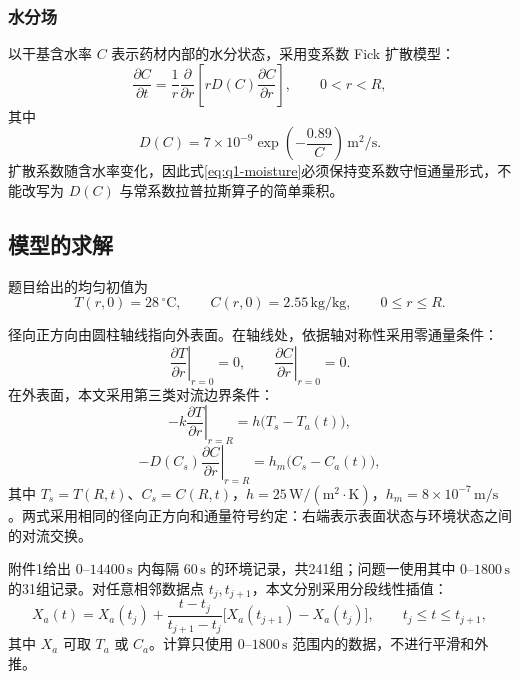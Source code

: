 \subsubsection{水分场}

以干基含水率 $C$ 表示药材内部的水分状态，采用变系数 Fick 扩散模型：
\begin{equation}
\frac{\partial C}{\partial t}
=\frac{1}{r}\frac{\partial}{\partial r}
\left[rD(C)\frac{\partial C}{\partial r}\right],
\qquad 0<r<R,
\label{eq:q1-moisture}
\end{equation}
其中
\begin{equation}
D(C)=7\times10^{-9}\exp\left(-\frac{0.89}{C}\right)\,\mathrm{m^2/s}.
\label{eq:q1-diffusivity}
\end{equation}
扩散系数随含水率变化，因此式\eqref{eq:q1-moisture}必须保持变系数守恒通量形式，不能改写为 $D(C)$ 与常系数拉普拉斯算子的简单乘积。

\subsection{模型的求解}

题目给出的均匀初值为
\begin{equation}
T(r,0)=28\,{}^\circ\mathrm{C},\qquad
C(r,0)=2.55\,\mathrm{kg/kg},
\qquad 0\le r\le R.
\label{eq:q1-initial}
\end{equation}

径向正方向由圆柱轴线指向外表面。在轴线处，依据轴对称性采用零通量条件：
\begin{equation}
\left.\frac{\partial T}{\partial r}\right|_{r=0}=0,
\qquad
\left.\frac{\partial C}{\partial r}\right|_{r=0}=0.
\label{eq:q1-center-bc}
\end{equation}
在外表面，本文采用第三类对流边界条件：
\begin{equation}
-k\left.\frac{\partial T}{\partial r}\right|_{r=R}
=h\bigl(T_s-T_a(t)\bigr),
\label{eq:q1-thermal-bc}
\end{equation}
\begin{equation}
-D(C_s)\left.\frac{\partial C}{\partial r}\right|_{r=R}
=h_m\bigl(C_s-C_a(t)\bigr),
\label{eq:q1-moisture-bc}
\end{equation}
其中 $T_s=T(R,t)$、$C_s=C(R,t)$，$h=25\,\mathrm{W/(m^2\cdot K)}$，$h_m=8\times10^{-7}\,\mathrm{m/s}$。两式采用相同的径向正方向和通量符号约定：右端表示表面状态与环境状态之间的对流交换。

附件1给出 $0$--$14400\,\mathrm{s}$ 内每隔 $60\,\mathrm{s}$ 的环境记录，共241组；问题一使用其中 $0$--$1800\,\mathrm{s}$ 的31组记录。对任意相邻数据点 $t_j,t_{j+1}$，本文分别采用分段线性插值：
\begin{equation}
X_a(t)=X_a(t_j)+\frac{t-t_j}{t_{j+1}-t_j}
\bigl[X_a(t_{j+1})-X_a(t_j)\bigr],
\qquad t_j\le t\le t_{j+1},
\label{eq:q1-interpolation}
\end{equation}
其中 $X_a$ 可取 $T_a$ 或 $C_a$。计算只使用 $0$--$1800\,\mathrm{s}$ 范围内的数据，不进行平滑和外推。

